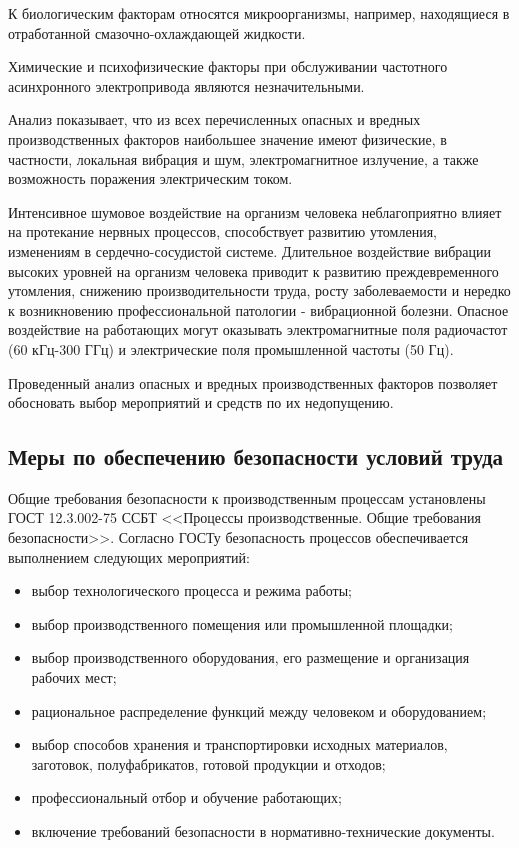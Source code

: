         К биологическим факторам относятся микроорганизмы, например,
        находящиеся в отработанной смазочно-охлаждающей жидкости. 

        Химические и психофизические факторы при обслуживании частотного
        асинхронного электропривода являются незначительными.

        Анализ показывает, что из всех перечисленных опасных и вредных
        производственных факторов наибольшее значение имеют физические, в
        частности, локальная вибрация и шум, электромагнитное излучение, а
        также возможность поражения электрическим током.

        Интенсивное шумовое воздействие на организм человека неблагоприятно
        влияет на протекание нервных процессов, способствует развитию
        утомления, изменениям в сердечно-сосудистой системе. Длительное
        воздействие вибрации высоких уровней на организм человека приводит к
        развитию преждевременного утомления, снижению производительности труда,
        росту заболеваемости и нередко к возникновению профессиональной
        патологии - вибрационной болезни.  Опасное воздействие на работающих
        могут оказывать электромагнитные поля радиочастот (60 кГц-300 ГГц) и
        электрические поля промышленной частоты (50 Гц). 

        
        Проведенный анализ опасных и вредных производственных факторов
        позволяет обосновать выбор мероприятий и средств по их недопущению.

    \subsection{Меры по обеспечению безопасности условий труда}

        Общие требования безопасности к производственным процессам установлены
        ГОСТ 12.3.002-75 ССБТ <<Процессы производственные. Общие требования
        безопасности>>. Согласно ГОСТу безопасность процессов обеспечивается
        выполнением следующих мероприятий:

        \begin{itemize}
            \item выбор технологического процесса и режима работы;
            \item выбор производственного помещения или промышленной площадки;
            \item выбор производственного оборудования, его размещение и
                организация рабочих мест;
            \item рациональное распределение функций между человеком и
                оборудованием;
            \item выбор способов хранения и транспортировки исходных
                материалов, заготовок, полуфабрикатов, готовой продукции и
                отходов; 
            \item профессиональный отбор и обучение работающих; 
            \item включение требований безопасности в нормативно-технические
                документы.
        \end{itemize}

